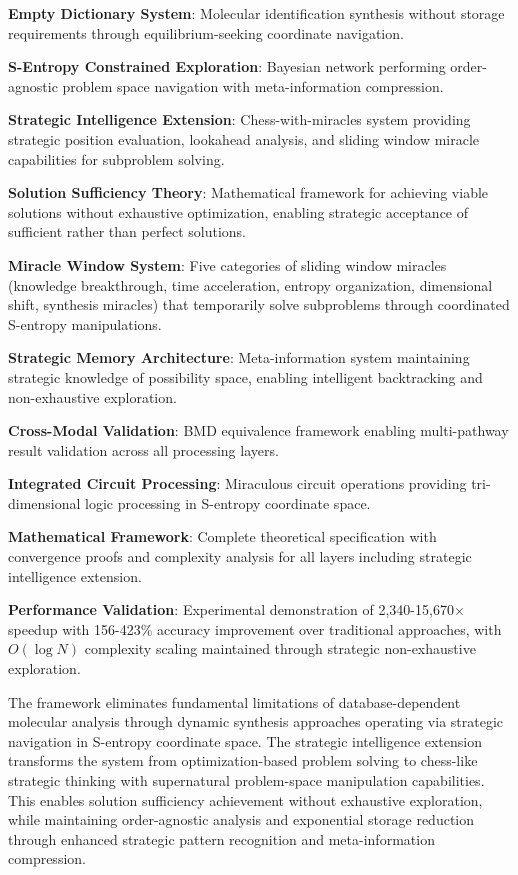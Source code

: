 \documentclass[12pt,a4paper]{article}
\begin{document}
\textbf{Empty Dictionary System}: Molecular identification synthesis without storage requirements through equilibrium-seeking coordinate navigation.

\textbf{S-Entropy Constrained Exploration}: Bayesian network performing order-agnostic problem space navigation with meta-information compression.

\textbf{Strategic Intelligence Extension}: Chess-with-miracles system providing strategic position evaluation, lookahead analysis, and sliding window miracle capabilities for subproblem solving.

\textbf{Solution Sufficiency Theory}: Mathematical framework for achieving viable solutions without exhaustive optimization, enabling strategic acceptance of sufficient rather than perfect solutions.

\textbf{Miracle Window System}: Five categories of sliding window miracles (knowledge breakthrough, time acceleration, entropy organization, dimensional shift, synthesis miracles) that temporarily solve subproblems through coordinated S-entropy manipulations.

\textbf{Strategic Memory Architecture}: Meta-information system maintaining strategic knowledge of possibility space, enabling intelligent backtracking and non-exhaustive exploration.

\textbf{Cross-Modal Validation}: BMD equivalence framework enabling multi-pathway result validation across all processing layers.

\textbf{Integrated Circuit Processing}: Miraculous circuit operations providing tri-dimensional logic processing in S-entropy coordinate space.

\textbf{Mathematical Framework}: Complete theoretical specification with convergence proofs and complexity analysis for all layers including strategic intelligence extension.

\textbf{Performance Validation}: Experimental demonstration of 2,340-15,670$\times$ speedup with 156-423\% accuracy improvement over traditional approaches, with $O(\log N)$ complexity scaling maintained through strategic non-exhaustive exploration.

The framework eliminates fundamental limitations of database-dependent molecular analysis through dynamic synthesis approaches operating via strategic navigation in S-entropy coordinate space. The strategic intelligence extension transforms the system from optimization-based problem solving to chess-like strategic thinking with supernatural problem-space manipulation capabilities. This enables solution sufficiency achievement without exhaustive exploration, while maintaining order-agnostic analysis and exponential storage reduction through enhanced strategic pattern recognition and meta-information compression.
\end{document}

